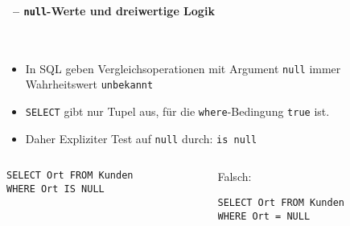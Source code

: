 \begin{frame}[fragile]\frametitle{\insertsection}
\framesubtitle{\insertsubsection\ -- \texttt{null}-Werte und dreiwertige Logik}
\\[4pt]
\begin{itemize}
	\item In SQL geben Vergleichsoperationen mit Argument \texttt{null} immer Wahrheitswert \texttt{unbekannt}
	\item \texttt{SELECT} gibt nur Tupel aus, f\"ur die \texttt{where}-Bedingung \texttt{true} ist.
	\item Daher Expliziter Test auf \texttt{null} durch: \texttt{is null} 
\end{itemize}
\vspace{1cm}
\begin{columns}
\begin{column}{.48\textwidth}
\begin{lstlisting}[xleftmargin=3ex]
SELECT Ort FROM Kunden
WHERE Ort IS NULL
\end{lstlisting}
\end{column}
\begin{column}{.48\textwidth}
\alert{Falsch:}
\begin{lstlisting}[xleftmargin=3ex]
SELECT Ort FROM Kunden
WHERE Ort = NULL
\end{lstlisting}
\end{column}
\end{columns}
\end{frame}

